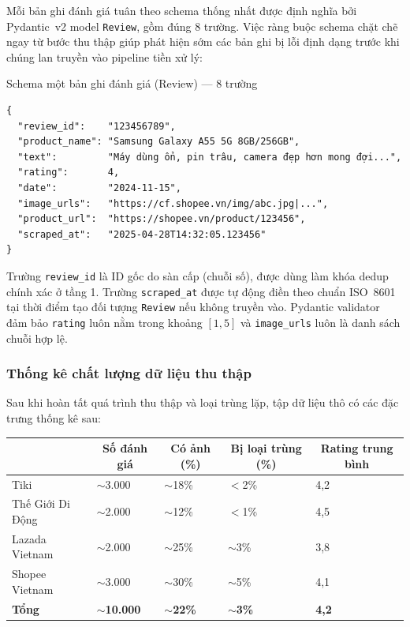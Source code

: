 Mỗi bản ghi đánh giá tuân theo schema thống nhất được định nghĩa bởi Pydantic~v2 model \texttt{Review}, gồm đúng 8 trường. Việc ràng buộc schema chặt chẽ ngay từ bước thu thập giúp phát hiện sớm các bản ghi bị lỗi định dạng trước khi chúng lan truyền vào pipeline tiền xử lý:

\begin{infobox}{Schema một bản ghi đánh giá (Review) --- 8 trường}
\begin{verbatim}
{
  "review_id":    "123456789",
  "product_name": "Samsung Galaxy A55 5G 8GB/256GB",
  "text":         "Máy dùng ổn, pin trâu, camera đẹp hơn mong đợi...",
  "rating":       4,
  "date":         "2024-11-15",
  "image_urls":   "https://cf.shopee.vn/img/abc.jpg|...",
  "product_url":  "https://shopee.vn/product/123456",
  "scraped_at":   "2025-04-28T14:32:05.123456"
}
\end{verbatim}
\end{infobox}

Trường \texttt{review\_id} là ID gốc do sàn cấp (chuỗi số), được dùng làm khóa dedup chính xác ở tầng 1. Trường \texttt{scraped\_at} được tự động điền theo chuẩn ISO~8601 tại thời điểm tạo đối tượng \texttt{Review} nếu không truyền vào. Pydantic validator đảm bảo \texttt{rating} luôn nằm trong khoảng $[1, 5]$ và \texttt{image\_urls} luôn là danh sách chuỗi hợp lệ.

\subsubsection{Thống kê chất lượng dữ liệu thu thập}

Sau khi hoàn tất quá trình thu thập và loại trùng lặp, tập dữ liệu thô có các đặc trưng thống kê sau:

\begin{center}
\renewcommand{\arraystretch}{1.4}

\begin{tabular}{|p{2.2cm}|p{2.2cm}|p{2.2cm}|p{2.6cm}|p{2.2cm}|}
\hline

\rowcolor[HTML]{E8E8E8}
\multicolumn{1}{|c|}{\textbf{Nền tảng}} &
\multicolumn{1}{c|}{\textbf{Số đánh giá}} &
\multicolumn{1}{c|}{\textbf{Có ảnh (\%)}} &
\multicolumn{1}{c|}{\textbf{Bị loại trùng (\%)}} &
\multicolumn{1}{c|}{\textbf{Rating trung bình}} \\
\hline

Tiki & $\sim$3.000 & $\sim$18\% & $<$2\% & 4,2 \\
\hline
Thế Giới Di Động & $\sim$2.000 & $\sim$12\% & $<$1\% & 4,5 \\
\hline
Lazada Vietnam & $\sim$2.000 & $\sim$25\% & $\sim$3\% & 3,8 \\
\hline
Shopee Vietnam & $\sim$3.000 & $\sim$30\% & $\sim$5\% & 4,1 \\
\hline

\textbf{Tổng} & $\boldsymbol{\sim}$\textbf{10.000} &
$\boldsymbol{\sim}$\textbf{22\%} &
$\boldsymbol{\sim}$\textbf{3\%} &
\textbf{4,2} \\
\hline

\end{tabular}
\end{center}

